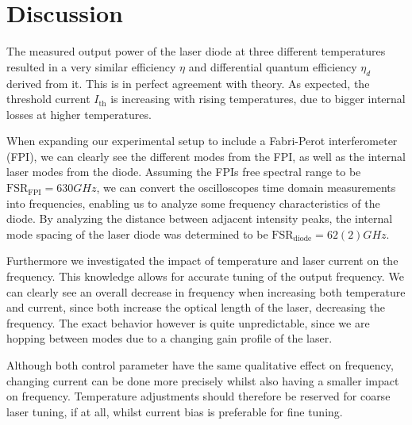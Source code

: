 \section{Discussion}
The measured output power of the laser diode at three different temperatures resulted in a very similar efficiency $\eta$ and differential quantum efficiency $\eta_d$ derived from it. This is in perfect agreement with theory. As expected, the threshold current $I_\mathrm{th}$ is increasing with rising temperatures, due to bigger internal losses at higher temperatures. 

When expanding our experimental setup to include a Fabri-Perot interferometer (FPI), we can clearly see the different modes from the FPI, as well as the internal laser modes from the diode. Assuming the FPIs free spectral range to be $\text{FSR}_\text{FPI} = 630 \unit{GHz}$, we can convert the oscilloscopes time domain measurements into frequencies, enabling us to analyze some frequency characteristics of the diode. By analyzing the distance between adjacent intensity peaks, the internal mode spacing of the laser diode was determined to be 
$\text{FSR}_\text{diode} = 62(2) \unit{GHz}$. 

Furthermore we investigated the impact of temperature and laser current on the frequency. This knowledge allows for accurate tuning of the output frequency. We can clearly see an overall decrease in frequency when increasing both temperature and current, since both increase the optical length of the laser, decreasing the frequency. The exact behavior however is quite unpredictable, since we are hopping between modes due to a changing gain profile  of the laser.

Although both control parameter have the same qualitative effect on frequency, changing current can be done more  precisely whilst also having a smaller impact on frequency. Temperature adjustments should therefore be reserved for coarse laser tuning, if at all, whilst current bias is preferable for fine tuning. 